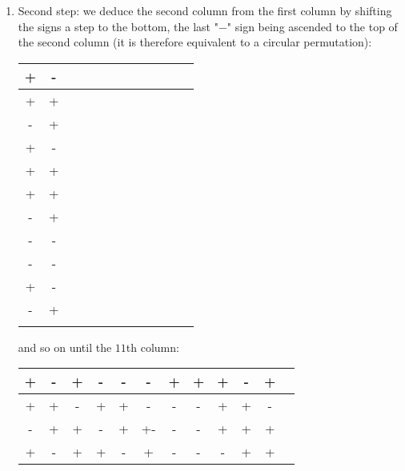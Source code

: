 \begin{enumerate}
		\item Second step: we deduce the second column from the first column by shifting the signs a step to the bottom, the last "$-$" sign being ascended to the top of the second column (it is therefore equivalent to a circular permutation):
		\begin{table}[H]
		\begin{center}
			\begin{tabular}{|c|c|c|c|c|c|c|c|c|c|c|c|}
			\hline 
			+ & - & {} & {} & {} & {} & {} & {} & {} & {} & {} & {} \\ 
			\hline 
			+ & + & {} & {} & {} & {} & {} & {} & {} & {} & {} & {} \\ 
			\hline 
			- & + & {} & {} & {} & {} & {} & {} & {} & {} & {} & {} \\ 
			\hline 
			+ & - & {} & {} & {} & {} & {} & {} & {} & {} & {} & {} \\ 
			\hline 
			+ & + & {} & {} & {} & {} & {} & {} & {} & {} & {} & {} \\ 
			\hline 
			+ & + & {} & {} & {} & {} & {} & {} & {} & {} & {} & {} \\ 
			\hline 
			- & + & {} & {} & {} & {} & {} & {} & {} & {} & {} & {} \\ 
			\hline 
			- & - & {} & {} & {} & {} & {} & {} & {} & {} & {} & {} \\ 
			\hline 
			- & - & {} & {} & {} & {} & {} & {} & {} & {} & {} & {} \\ 
			\hline 
			+ & - & {} & {} & {} & {} & {} & {} & {} & {} & {} & {} \\ 
			\hline 
			- & + & {} & {} & {} & {} & {} & {} & {} & {} & {} & {} \\ 
			\hline 
			{} & {} & {} & {} & {} & {} & {} & {} & {} & {} & {} & {} \\ 
			\hline 
			\end{tabular}
		\end{center}
		\end{table}	
		and so on until the $11$th column:
		\begin{table}[H]
		\begin{center}
			\begin{tabular}{|c|c|c|c|c|c|c|c|c|c|c|c|}
			\hline 
			+ & - & + & - & - & - & + & + & + & - & + & {} \\ 
			\hline 
			+ & + & - & + & + & - & - & - & + & + & - & {} \\ 
			\hline 
			- & + & + & - & + & +-& - & - & + & + & + & {} \\ 
			\hline 
			+ & - & + & + & - & + & - & - & - & + & + & {} \\ 

\end{tabular}
\end{center}
\end{table}
\end{enumerate}
